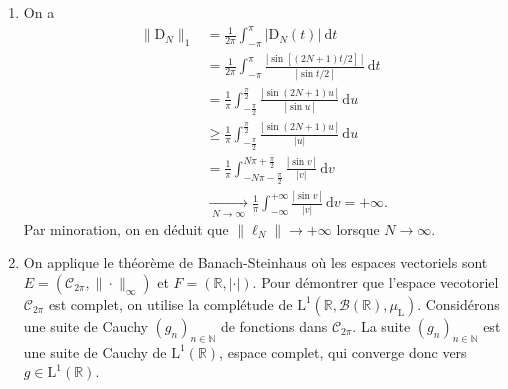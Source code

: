 \documentclass{../../td}
\begin{document}
\begin{enumerate}
      De plus, $g_{\varepsilon}$ est dominée par $|\mathrm{D}_N|$ intégrable.
      Par le théorème de convergence dominée, 
      \[
        |\ell_N(f_\varepsilon)| = \ell_N(f_\varepsilon) \xrightarrow[\;\varepsilon \to 0\;]{} \frac{1}{2\pi} \int_{-\pi}^\pi |\mathrm{D}_N(t)|\:\mathrm{d}t = \| \mathrm{D}_N \|_1
      .\]
      On vérifie aisément que
      \begin{itemize}
        \item $f_\varepsilon$ est  $2\pi$-périodique et continue (simple à remarquer à partir de la forme de somme d'exponentielles) ;
        \item $\|f_{\varepsilon}\|_\infty = \sup_{t\: \in\: \left]{-\pi}, \pi \right[}|\mathrm{D}_N(t)| / (|\mathrm{D}_N(t)| + \varepsilon) \le 1$.
      \end{itemize}
      On en conclut que \[
      \|\ell_N\| = \|\mathrm{D}_N\|_1
      .\]
    \item On a
      \begin{align*}
        \|\mathrm{D}_N\|_1
        &= \frac{1}{2\pi} \int_{-\pi}^\pi |\mathrm{D}_N(t)|\: \mathrm{d}t\\
        &= \frac{1}{2\pi} \int_{-\pi}^\pi \frac{|\sin[(2 N +1)t / 2]\,|}{|\sin t / 2\,|}\: \mathrm{d}t\\
        &= \frac{1}{\pi} \int_{-\frac{\pi}{2}}^{\frac{\pi}{2}} \frac{|\sin (2N+1) u\,|}{|\sin u\,|}\:\mathrm{d}u\\
        &\ge \frac{1}{\pi} \int_{-\frac{\pi}{2}}^{\frac{\pi}{2}} \frac{|\sin (2N+1) u\,|}{|u|}\:\mathrm{d}u\\
        &= \frac{1}{\pi} \int_{-N\pi- \frac{\pi}{2}}^{N\pi + \frac{\pi}{2}} \frac{|\sin v\,|}{|v|}\:\mathrm{d}v\\
        &\xrightarrow[\;N \to \infty\;]{} \frac{1}{\pi} \int_{-\infty}^{+\infty} \frac{|\sin v\,|}{|v|}\: \mathrm{d}v = +\infty
      .\end{align*}
      Par minoration, on en déduit que $\|\ell_N\| \to +\infty$ lorsque $N \to \infty$. \label{ex1-q3}
    \item On applique le théorème de Banach-Steinhaus où les espaces vectoriels sont $E = (\mathcal{C}_{2\pi}, \|\cdot\|_\infty)$ et $F = (\mathds{R}, |\cdot|)$.
      Pour démontrer que l'espace vecotoriel $\mathcal{C}_{2\pi}$ est complet, on utilise la complétude de $\mathrm{L}^1(\mathds{R}, \mathcal{B}(\mathds{R}), \mu_\mathrm{L})$.
      Considérons une suite de Cauchy $(g_n)_{n \in \mathds{N}}$ de fonctions dans $\mathcal{C}_{2\pi}$.
      La suite $(g_n)_{n \in \mathds{N}}$ est une suite de Cauchy de $\mathrm{L}^1(\mathds{R})$, espace complet, qui converge donc vers $g \in \mathrm{L}^1(\mathds{R})$.

\end{enumerate}
\end{document}
